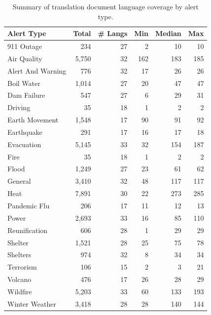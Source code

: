 \begin{table}
\centering
\setlength{\tabcolsep}{3pt}
\renewcommand{\arraystretch}{0.95}
\begin{tabular}{lrrrrr}
\toprule
\textbf{Alert Type} & \textbf{Total} & \textbf{\# Langs} & \textbf{Min} & \textbf{Median} & \textbf{Max} \\
\midrule
911 Outage & 234 & 27 & 2 & 10 & 10 \\
Air Quality & 5,750 & 32 & 162 & 183 & 185 \\
Alert And Warning & 776 & 32 & 17 & 26 & 26 \\
Boil Water & 1,014 & 27 & 20 & 47 & 47 \\
Dam Failure & 547 & 27 & 6 & 29 & 31 \\
Driving & 35 & 18 & 1 & 2 & 2 \\
Earth Movement & 1,548 & 17 & 90 & 91 & 92 \\
Earthquake & 291 & 17 & 16 & 17 & 18 \\
Evacuation & 5,145 & 33 & 32 & 154 & 187 \\
Fire & 35 & 18 & 1 & 2 & 2 \\
Flood & 1,249 & 27 & 23 & 61 & 62 \\
General & 3,410 & 32 & 48 & 117 & 117 \\
Heat & 7,891 & 30 & 22 & 273 & 285 \\
Pandemic Flu & 206 & 17 & 11 & 12 & 13 \\
Power & 2,693 & 33 & 16 & 85 & 110 \\
Reunification & 606 & 28 & 1 & 29 & 29 \\
Shelter & 1,521 & 28 & 25 & 75 & 78 \\
Shelters & 974 & 32 & 8 & 34 & 34 \\
Terrorism & 106 & 15 & 2 & 3 & 21 \\
Volcano & 476 & 17 & 26 & 28 & 29 \\
Wildfire & 5,203 & 33 & 60 & 133 & 193 \\
Winter Weather & 3,418 & 28 & 28 & 140 & 144 \\
\bottomrule
\end{tabular}
\caption{Summary of translation document language coverage by alert type.}
\label{tab:combined_translations_per_alert_lang_summary}
\end{table}